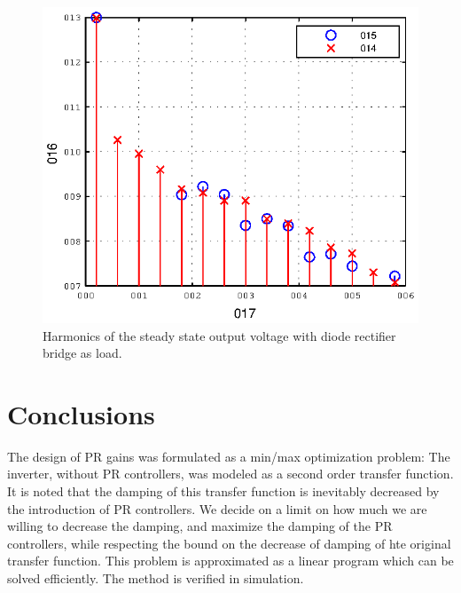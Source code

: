 \documentclass[conference,10pt]{IEEEtran}
\begin{document}
\begin{figure}[!h]
\centering

\includegraphics{fig/steady_state_harmonics}
\caption{Harmonics of the steady state output voltage with diode rectifier bridge as load.}
\label{fig:ss_harm}
\end{figure}

%




\section{Conclusions}
\label{sec:conc}

The design of PR gains was formulated as a min/max optimization problem: The inverter, without PR controllers, was modeled as a second order transfer function. It is noted that the damping of this transfer function is inevitably decreased by the introduction of 
PR controllers. We decide on a limit on how much we are willing to decrease the damping, and maximize the damping of the PR controllers, while respecting the bound on the decrease of damping of hte original transfer function. This problem is approximated as a linear program which can be solved efficiently.
The method is verified in simulation.
  






\end{document}
